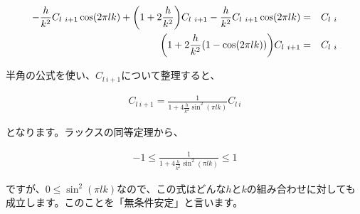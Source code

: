 \begin{eqnarray}
    -\frac{h}{k^2}C_{l\ i+1}\cos(2\pi lk)+\pqty{1+2\frac{h}{k^2}}C_{l\ i+1}-\frac{h}{k^2}C_{l\ i+1}\cos(2\pi lk)&=&C_{l\ i} \\
    \pqty{1+2\frac{h}{k^2}\pqty{1-\cos(2\pi lk)}}C_{l\ i+1}&=&C_{l\ i}
\end{eqnarray}

半角の公式を使い、$C_{l\ i+1}$について整理すると、

\begin{eqnarray}
    C_{l\ i+1}=\frac{1}{1+4\frac{h}{k^2}\sin^2(\pi lk)}C_{l\ i}
\end{eqnarray}

\noindent
となります。ラックスの同等定理から、

\begin{eqnarray}
    -1\leq\frac{1}{1+4\frac{h}{k^2}\sin^2(\pi lk)}\leq1
\end{eqnarray}

ですが、$0\leq\sin^2(\pi lk)$なので、この式はどんな$h$と$k$の組み合わせに対しても成立します。このことを「無条件安定」と言います。